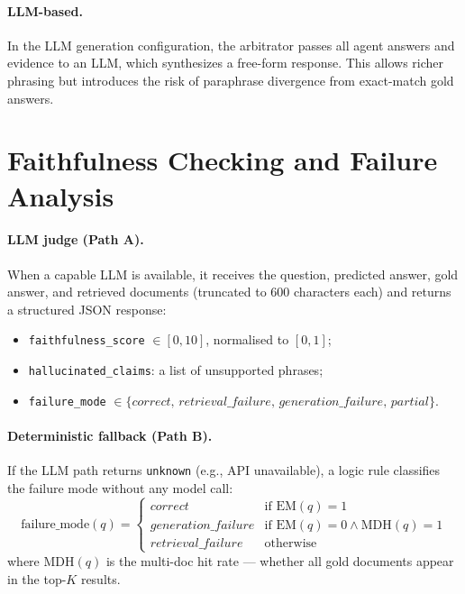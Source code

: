 \documentclass{article}
\begin{document}
\paragraph{LLM-based.}
In the LLM generation configuration, the arbitrator passes all agent
answers and evidence to an LLM, which synthesizes a free-form response.
This allows richer phrasing but introduces the risk of paraphrase
divergence from exact-match gold answers.

\section{Faithfulness Checking and Failure Analysis}
\label{sec:faithfulness}

\paragraph{LLM judge (Path A).}
When a capable LLM is available, it receives the question, predicted
answer, gold answer, and retrieved documents (truncated to 600 characters
each) and returns a structured JSON response:
\begin{itemize}
  \item \texttt{faithfulness\_score} $\in [0, 10]$, normalised to $[0,1]$;
  \item \texttt{hallucinated\_claims}: a list of unsupported phrases;
  \item \texttt{failure\_mode} $\in \{\textit{correct},\,
        \textit{retrieval\_failure},\, \textit{generation\_failure},\,
        \textit{partial}\}$.
\end{itemize}

\paragraph{Deterministic fallback (Path B).}
If the LLM path returns \texttt{unknown} (e.g., API unavailable), a
logic rule classifies the failure mode without any model call:
\begin{equation}
  \text{failure\_mode}(q) =
  \begin{cases}
    \textit{correct}            & \text{if } \text{EM}(q) = 1 \\
    \textit{generation\_failure}& \text{if } \text{EM}(q) = 0 \wedge
                                              \text{MDH}(q) = 1 \\
    \textit{retrieval\_failure} & \text{otherwise}
  \end{cases}
\end{equation}
where $\text{MDH}(q)$ is the multi-doc hit rate — whether all gold
documents appear in the top-$K$ results.
\end{document}
